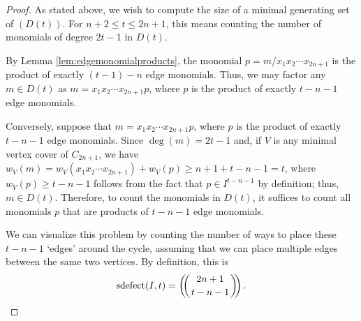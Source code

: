 \documentclass[12pt]{amsart}
\def\multichoose#1#2{\ensuremath{\left(\kern-.3em\left(\genfrac{}{}{0pt}{}{#1}{#2}\right)\kern-.3em\right)}}
\def\sdefect{\operatorname{sdefect}}
\renewcommand{\ge}{\geqslant}
\renewcommand{\le}{\leqslant}
\theoremstyle{plain}
\theoremstyle{definition}
\begin{document}
\begin{proof}
	As stated above, we wish to compute the size of a minimal generating set of $(D(t))$.
	For $n+2\le t\le 2n+1$, this means counting the number of monomials of degree $2t-1$ in $D(t)$.
	
	
	By Lemma \ref{lem:edgemonomialproducts}, the monomial $p = m/x_1 x_2 \cdots x_{2n+1}$ is the product of exactly $(t-1) - n$ edge monomials.
	 Thus, we may factor any $m\in D(t)$ as $m = x_1 x_2 \cdots x_{2n+1} p$, where $p$ is the product of exactly $t-n-1$ edge monomials.
	
	
	Conversely, suppose that $m = x_1 x_2 \cdots x_{2n+1} p$, where $p$ is the product of exactly $t-n-1$ edge monomials.
	Since $\deg(m) = 2t-1$ and, if $V$ is any minimal vertex cover of $C_{2n+1}$, we have $w_V(m) = w_V(x_1 x_2 \cdots x_{2n+1}) + w_V(p) \ge n+1 + t-n-1 = t$, where $w_V(p)\ge t-n-1$ follows from the fact that $p\in I^{t-n-1}$ by definition; thus, $m\in D(t)$.
	Therefore, to count the monomials in $D(t)$, it suffices to count all monomials $p$ that are products of $t-n-1$ edge monomials.

	
	We can visualize this problem by counting the number of ways to place these $t-n-1$ `edges' around the cycle, assuming that we can place multiple edges between the same two vertices. %
	By definition, this is
	\[
		\sdefect(I,t) = \multichoose{2n+1}{t-n-1}.
	\]	
\end{proof}
\end{document}

